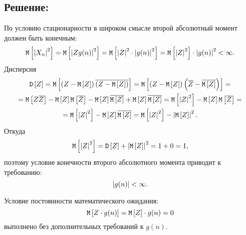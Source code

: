\documentclass[12pt]{article}
\begin{document}
    \subsection*{Решение:}
    По условию стационарности в широком смысле второй абсолютный момент должен быть конечным:
    \[
        \mathtt{M} \left [ \left | X_n \right |^2 \right ]
        = \mathtt{M} \left [ \left | Z g(n) \right |^2 \right ]
        = \mathtt{M} \left [ \left | Z \right |^2 \cdot \left | g(n) \right |^2 \right ]
        = \mathtt{M} \left [ \left | Z \right |^2 \right ] \cdot \left | g(n) \right |^2
        < \infty .
    \]
    Дисперсия
    \begin{multline*}
        \mathtt{D} \left [ Z \right ]
        = \mathtt{M} \left [ \left ( Z - \mathtt{M} \left [ Z \right ] \right ) \overline{ \left (Z - \mathtt{M} \left [ Z \right ] \right )} \right ]
        = \mathtt{M} \left [ \left ( Z - \mathtt{M} \left [ Z \right ] \right ) \left (\overline{Z} - \overline{\mathtt{M} \left [ Z \right ]} \right ) \right ] = \\
        = \mathtt{M} \left [ Z \overline{Z} \right ] - \mathtt{M} \left [ Z \right ] \mathtt{M} \left [ \overline{Z} \right ] - \mathtt{M} \left [ Z \right ] \overline{\mathtt{M} \left [ Z \right ]} + \mathtt{M} \left [ Z \right ] \overline{\mathtt{M} \left [ Z \right ]}
        = \mathtt{M} \left [ \left | Z \right |^2 \right ] - \mathtt{M} \left [ Z \right ] \mathtt{M} \left [ \overline{Z} \right ] = \\
        = \mathtt{M} \left [ \left | Z \right |^2 \right ] - \mathtt{M} \left [ Z \right ] \overline{\mathtt{M} \left [ Z \right ]}
        = \mathtt{M} \left [ \left | Z \right |^2 \right ] - \left | \mathtt{M} \left [ Z \right ] \right |^2.
    \end{multline*}
    Откуда
    \[
        \mathtt{M} \left [ \left | Z \right |^2 \right ]
        = \mathtt{D} \left [ Z \right ] + \left | \mathtt{M} \left [ Z \right ] \right |^2
        = 1 + 0
        = 1,
    \]
    поэтому условие конечности второго абсолютного момента приводит к требованию:
    \[
        \left | g(n) \right | < \infty.
    \]

    Условие постоянности математического ожидания:
    \[
        \mathtt{M} \left [ Z \cdot g(n) \right ]
        = \mathtt{M} \left [ Z \right ] \cdot g(n)
        = 0
    \]
    выполнено без дополнительных требований к $g(n)$.
\end{document}
